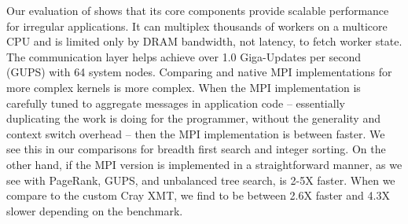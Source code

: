 Our evaluation of \Grappa shows that its core components provide scalable performance for irregular applications.  It can multiplex thousands of workers on a multicore CPU and is limited only by DRAM bandwidth, not latency, to fetch worker state.  The communication layer helps \Grappa achieve over 1.0 Giga-Updates per second (GUPS) with 64 system nodes. Comparing \Grappa and native MPI implementations for more complex kernels is more complex.  When the MPI implementation is carefully tuned to aggregate messages in application code -- essentially duplicating the work \Grappa is doing for the programmer, without the generality and context switch overhead -- then the MPI implementation is between  faster.  We see this in our comparisons for breadth first search and integer sorting.  On the other hand, if the MPI version is implemented in a straightforward manner, as we see with PageRank, GUPS, and unbalanced tree search, \Grappa is 2-5X faster.  When we compare \Grappa to the custom Cray XMT, we find \Grappa to be between 2.6X faster and 4.3X slower depending on the benchmark.
 
